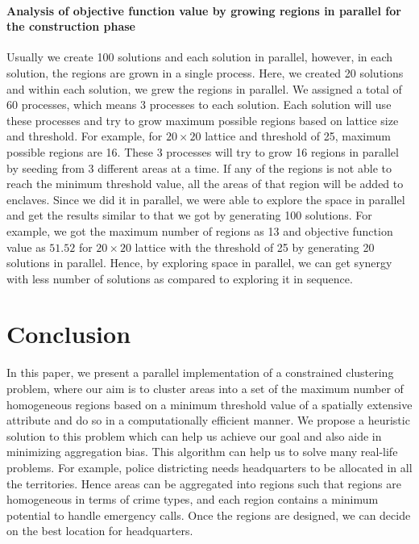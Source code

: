 \documentclass[conference]{IEEEtran}
\begin{document}
\paragraph{Analysis of objective function value by growing regions in parallel for the construction phase}
Usually
we create 100 solutions and each solution in parallel, however, in each
solution, the regions are grown in a single process. Here, we created 20
solutions and within each solution, we grew the regions in parallel. We assigned
a total of 60 processes, which means 3 processes to each solution. Each solution
will use these processes and try to grow maximum possible regions based on
lattice size and threshold. For example, for $20\times 20$ lattice and threshold
of 25, maximum possible regions are 16. These 3 processes will try to grow 16
regions in parallel by seeding from 3 different areas at a time. If any of the
regions is not able to reach the minimum threshold value, all the areas of that
region will be added to enclaves. Since we did it in parallel, we were able to
explore the space in parallel and get the results similar to that we got by
generating 100 solutions. For example, we got the maximum number of regions as
13 and objective function value as $51.52$ for $20\times 20$ lattice with the
threshold of 25 by generating 20 solutions in parallel. Hence, by exploring
space in parallel, we can get synergy with less number of solutions as compared
to exploring it in sequence.


\section{Conclusion}\label{s:conclusion}

In this paper, we present a parallel implementation of a constrained clustering
problem, where our aim is to cluster areas into a set of the maximum number of
homogeneous regions based on a minimum threshold value of a spatially extensive
attribute and do so in a computationally efficient manner. We propose a
heuristic solution to this problem which can help us achieve our goal and also
aide in minimizing aggregation bias. This algorithm can help us to solve many
real-life problems. For example, police districting needs headquarters to be
allocated in all the territories. Hence areas can be aggregated into regions
such that regions are homogeneous in terms of crime types, and each region
contains a minimum potential to handle emergency calls. Once the regions are
designed, we can decide on the best location for headquarters.
\end{document}
